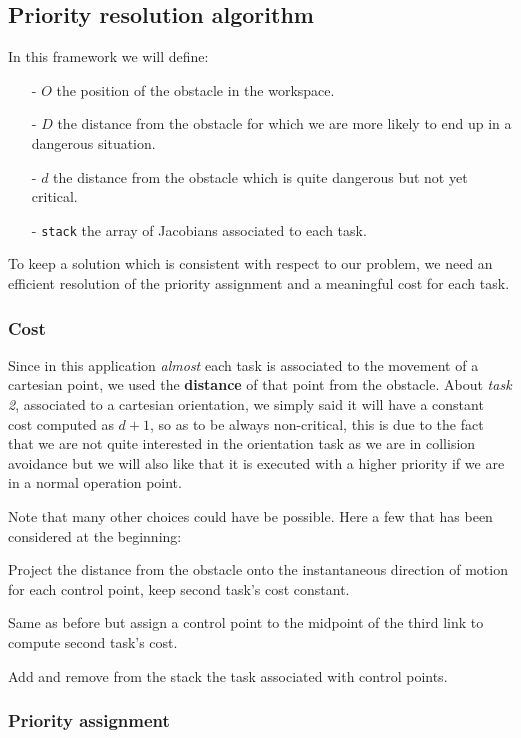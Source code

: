 \documentclass[11pt,a4paper, twocolumn, twoside]{article}
\begin{document}
\subsection{Priority resolution algorithm}
In this framework we will define:
\begin{enumerate}
\item[-] $O$ the position of the obstacle in the workspace.
\item[-] $D$ the distance from the obstacle for which we are more likely to end up in a dangerous situation.
\item[-] $d$ the distance from the obstacle which is quite dangerous but not yet critical.
\item[-] \texttt{stack} the array of Jacobians associated to each task.
\end{enumerate}
To keep a solution which is consistent with respect to our problem, we need an efficient resolution of the priority assignment and a meaningful cost for each task.
\subsubsection{Cost}
Since in this application \textit{almost} each task is associated to the movement of a cartesian point, we used the \textbf{distance} of that point from the obstacle.
About \textit{task 2}, associated to a cartesian orientation, we simply said it will have a constant cost computed as $d + 1$, so as to be always non-critical, this is due to the fact that we are not quite interested in the orientation task as we are in collision avoidance but we will also like that it is executed with a higher priority if we are in a normal operation point.

Note that many other choices could have be possible. Here a few that has been considered at the beginning:
\begin{list}{\textbf{Case:}}{}
\item Project the distance from the obstacle onto the instantaneous direction of motion for each control point, keep second task's cost constant.
\item Same as before but assign a control point to the midpoint of the third link to compute second task's cost.
\item Add and remove from the stack the task associated with control points.
\end{list}
\subsubsection{Priority assignment}
\end{document}
